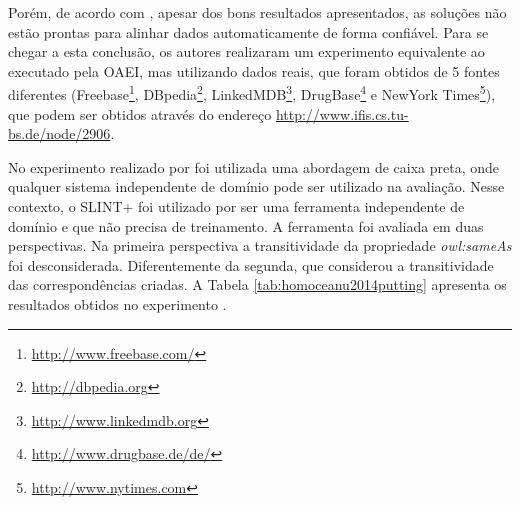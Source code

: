Porém, de acordo com , apesar dos bons resultados apresentados, as soluções não estão prontas para alinhar dados automaticamente de forma confiável. Para se chegar a esta conclusão, os autores realizaram um experimento equivalente ao executado pela OAEI, mas utilizando dados reais, que foram obtidos de 5 fontes diferentes (Freebase\footnote{\url{http://www.freebase.com/}}, DBpedia\footnote{\url{http://dbpedia.org}}, LinkedMDB\footnote{\url{http://www.linkedmdb.org}}, DrugBase\footnote{\url{http://www.drugbase.de/de/}} e NewYork Times\footnote{\url{http://www.nytimes.com}}), que podem ser obtidos através do endereço \url{http://www.ifis.cs.tu-bs.de/node/2906}.

No experimento realizado por  foi utilizada uma abordagem de caixa preta, onde qualquer sistema independente de domínio pode ser utilizado na avaliação. Nesse contexto, o SLINT+ \cite{nguyen2012interlinking} foi utilizado por ser uma ferramenta independente de domínio e que não precisa de treinamento. A ferramenta foi avaliada em duas perspectivas. Na primeira perspectiva a transitividade da propriedade \textit{owl:sameAs} foi desconsiderada. Diferentemente da segunda, que considerou a transitividade das correspondências criadas. A Tabela \ref{tab:homoceanu2014putting} apresenta os resultados obtidos no experimento \cite{homoceanu2014putting}.

